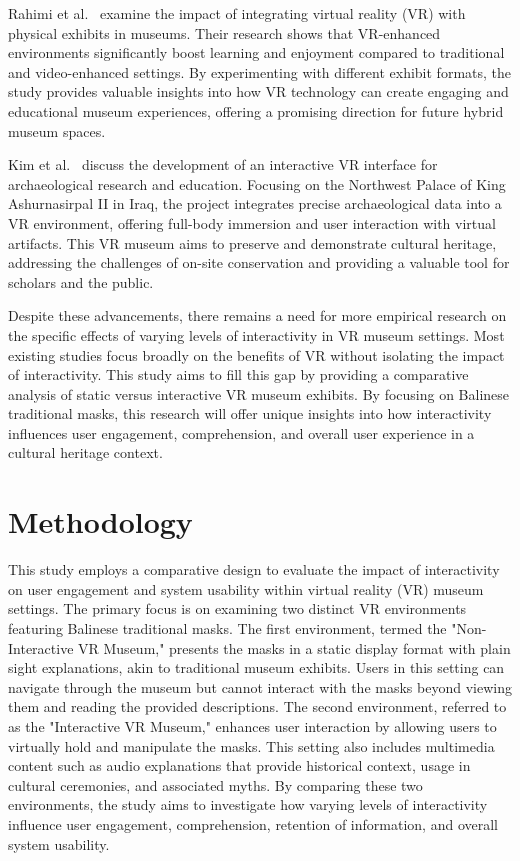\documentclass[conference]{IEEEtran}
\begin{document}
Rahimi et al.~\cite{9286680} examine the impact of integrating virtual reality (VR) with physical exhibits in museums. Their research shows that VR-enhanced environments significantly boost learning and enjoyment compared to traditional and video-enhanced settings. By experimenting with different exhibit formats, the study provides valuable insights into how VR technology can create engaging and educational museum experiences, offering a promising direction for future hybrid museum spaces.

Kim et al.~\cite{6797425} discuss the development of an interactive VR interface for archaeological research and education. Focusing on the Northwest Palace of King Ashurnasirpal II in Iraq, the project integrates precise archaeological data into a VR environment, offering full-body immersion and user interaction with virtual artifacts. This VR museum aims to preserve and demonstrate cultural heritage, addressing the challenges of on-site conservation and providing a valuable tool for scholars and the public.

Despite these advancements, there remains a need for more empirical research on the specific effects of varying levels of interactivity in VR museum settings. Most existing studies focus broadly on the benefits of VR without isolating the impact of interactivity. This study aims to fill this gap by providing a comparative analysis of static versus interactive VR museum exhibits. By focusing on Balinese traditional masks, this research will offer unique insights into how interactivity influences user engagement, comprehension, and overall user experience in a cultural heritage context.

\section{Methodology}

This study employs a comparative design to evaluate the impact of interactivity on user engagement and system usability within virtual reality (VR) museum settings. The primary focus is on examining two distinct VR environments featuring Balinese traditional masks. The first environment, termed the "Non-Interactive VR Museum," presents the masks in a static display format with plain sight explanations, akin to traditional museum exhibits. Users in this setting can navigate through the museum but cannot interact with the masks beyond viewing them and reading the provided descriptions. The second environment, referred to as the "Interactive VR Museum," enhances user interaction by allowing users to virtually hold and manipulate the masks. This setting also includes multimedia content such as audio explanations that provide historical context, usage in cultural ceremonies, and associated myths. By comparing these two environments, the study aims to investigate how varying levels of interactivity influence user engagement, comprehension, retention of information, and overall system usability.
\end{document}
